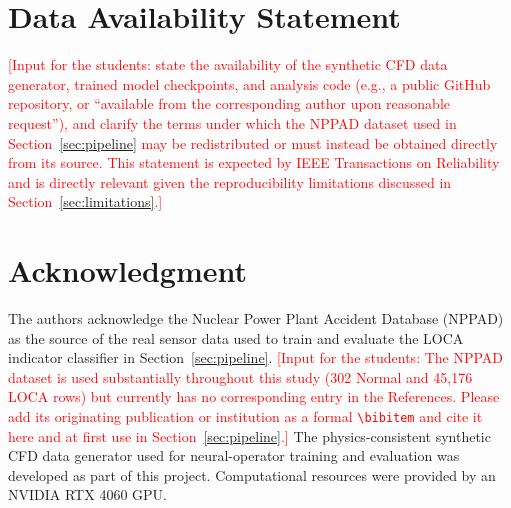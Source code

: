 \documentclass[journal]{IEEEtran}
\begin{document}
\section*{Data Availability Statement}
\textcolor{red}{[Input for the students: state the availability of the synthetic CFD data generator, trained model checkpoints, and analysis code (e.g., a public GitHub repository, or ``available from the corresponding author upon reasonable request''), and clarify the terms under which the NPPAD dataset used in Section~\ref{sec:pipeline} may be redistributed or must instead be obtained directly from its source. This statement is expected by IEEE Transactions on Reliability and is directly relevant given the reproducibility limitations discussed in Section~\ref{sec:limitations}.]}

\section*{Acknowledgment}
The authors acknowledge the Nuclear Power Plant Accident Database (NPPAD) as the source of the real sensor data used to train and evaluate the LOCA indicator classifier in Section~\ref{sec:pipeline}. \textcolor{red}{[Input for the students: The NPPAD dataset is used substantially throughout this study (302 Normal and 45,176 LOCA rows) but currently has no corresponding entry in the References. Please add its originating publication or institution as a formal \texttt{\textbackslash bibitem} and cite it here and at first use in Section~\ref{sec:pipeline}.]} The physics-consistent synthetic CFD data generator used for neural-operator training and evaluation was developed as part of this project. Computational resources were provided by an NVIDIA RTX 4060 GPU.
\end{document}
